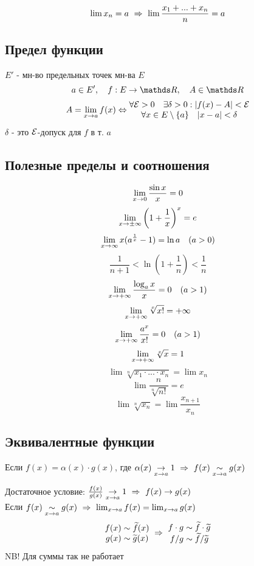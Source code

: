 \documentclass[main]{subfiles}
\begin{document}
    \begin{Utv}
        \[\lim x_n = a \ \Rightarrow\  \lim \frac{x_1 + ... + x_n}{n} = a\]
    \end{Utv}

    \newpage
    \subsection{Предел функции}
    \begin{definition}
        $E'$ - мн-во предельных точек мн-ва $E$
        \[a \in E',\q f: E \ra \R,\q A \in \R\]
        \[A = \lim_{x \rightarrow a} f(x) \Leftrightarrow \begin{matrix}
            \forall \mathcal{E} > 0 \quad \exists \delta>0: |f(x) - A| < \mathcal{E}\\
            \forall x \in E \setminus \{a\} \quad |x-a| < \delta
        \end{matrix}\]
        $\delta$ - это $\mathcal{E}$-допуск для $f$ в т. $a$
    \end{definition}

    \newpage
    \subsection{Полезные пределы и соотношения}
    \[\lim_{x \rightarrow 0} \frac{\sin x}{x} = 0\]
    \[\lim_{x \rightarrow \pm \infty} \left(1 + \frac{1}{x}\right)^x = e\]
    \[\lim_{x \rightarrow \infty} x (a^{\frac{1}{x}}-1) = \ln a \quad (a > 0)\]
    \[\frac{1}{n+1} < \ln(1 + \frac{1}{n}) < \frac{1}{n}\]
    \[\lim_{x \rightarrow +\infty} \frac{\log_a x}{x} = 0 \quad (a > 1)\]
    \[\lim_{x \rightarrow +\infty} \sqrt[x]{x!} = +\infty\]
    \[\lim_{x \rightarrow +\infty} \frac{a^x}{x!} = 0 \quad (a > 1)\]
    \[\lim_{x \rightarrow +\infty} \sqrt[x]{x} = 1\]
    \[\lim \sqrt[n]{x_1 \cdot ... \cdot x_n} = \lim x_n\]
    \[\lim \frac{n}{\sqrt[n]{n!}} = e\]
    \[\lim \sqrt[n]{x_n} = \lim \frac{x_{n+1}}{x_n}\]

    \newpage
    \subsection{Эквивалентные функции}
    \begin{definition}
        Если $f(x) = \alpha(x) \cdot g(x)$, где $\alpha(x) \underset{x \rightarrow a}{\rightarrow} 1 \ \Rightarrow\  f(x) \underset{x \rightarrow a}{\sim} g(x)$\\
    \end{definition}

    \begin{remark}
      Достаточное условие: $\frac{f(x)}{g(x)} \underset{x \rightarrow a}{\rightarrow} 1 \ \Rightarrow\  f(x) \rightarrow g(x)$\\
      Если $f(x) \underset{x \rightarrow a}{\sim} g(x) \ \Rightarrow\  \lim_{x \rightarrow a} f(x) = \lim_{x \rightarrow a} g(x)$
      \[\begin{matrix}
        f(x) \sim \widetilde{f}(x)\\
        g(x) \sim \widetilde{g}(x)
      \end{matrix} \ \Rightarrow\  \begin{matrix}
        f \cdot g \sim \widetilde{f} \cdot \widetilde{g}\\
        f / g \sim \widetilde{f} / \widetilde{g}
      \end{matrix}\]
      NB! Для суммы так не работает
    \end{remark}
\end{document}
